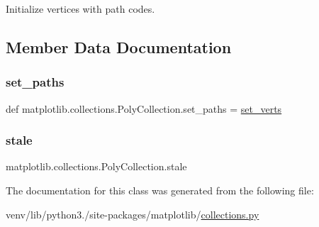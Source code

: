\begin{DoxyVerb}Initialize vertices with path codes.\end{DoxyVerb}
 

\subsection{Member Data Documentation}
\mbox{\label{classmatplotlib_1_1collections_1_1PolyCollection_a4be914300c28f1229ba5b265221d6357}} 
\subsubsection{\texorpdfstring{set\+\_\+paths}{set\_paths}}
{\footnotesize\ttfamily def matplotlib.\+collections.\+Poly\+Collection.\+set\+\_\+paths = \hyperlink{classmatplotlib_1_1collections_1_1PolyCollection_ada06fb0a14e12f529a52badcfd9f1d1b}{set\+\_\+verts}\hspace{0.3cm}{\ttfamily [static]}}

\mbox{\label{classmatplotlib_1_1collections_1_1PolyCollection_a988c7061b07dc3f8f10547f576d37d15}} 
\subsubsection{\texorpdfstring{stale}{stale}}
{\footnotesize\ttfamily matplotlib.\+collections.\+Poly\+Collection.\+stale}



The documentation for this class was generated from the following file\+:\begin{DoxyCompactItemize}
\item 
venv/lib/python3./site-\/packages/matplotlib/\hyperlink{collections_8py}{collections.\+py}\end{DoxyCompactItemize}
